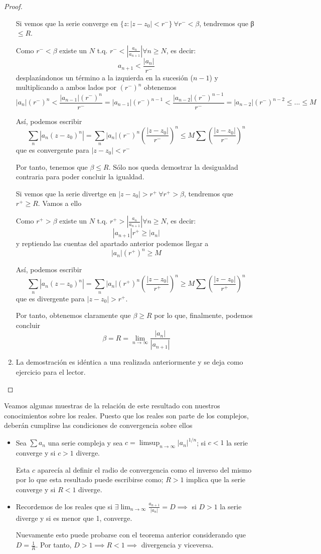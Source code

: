 \documentclass{apuntes}
\begin{document}
\begin{proof}
\begin{enumerate}
Si vemos que la serie converge en $\{z: |z-z_0| < r^-\} \ \forall r^-<β$, tendremos que β $\leq R$.

Como $r^- < β$ existe un $N$ t.q. $r^-<\left|\frac{a_n}{a_{n+1}} \right| \forall n \geq N$, es decir:
\[a_{n+1} < \frac{|a_n|}{r^-}\]
desplazándonos un término a la izquierda en la sucesión ($n-1$) y multiplicando a ambos lados por $(r^-)^n$ obtenemos
\[|a_n|(r^-)^n < \frac{|a_{n-1}|(r^-)^n}{r^-} = |a_{n-1}|(r^-)^{n-1}<\frac{|a_{n-2}|(r^-)^{n-1}}{r^-}=|a_{n-2}|(r^-)^{n-2} \leq ... \leq M\]

Así, podemos escribir
\[\sum_n |a_n(z-z_0)^n|=\sum_n |a_n|(r^-)^n\left(\frac{|z-z_0|}{r^-}\right)^n \leq M \sum \left( \frac{|z-z_0|}{r^-}\right)^n\]
que es convergente para $|z-z_0|<r^-$

Por tanto, tenemos que $β \leq R$. Sólo nos queda demostrar la desigualdad contraria para poder concluir la igualdad.

Si vemos que la serie divertge en $|z-z_0|>r^+ \ \forall r^+ > β$, tendremos que $r^+\geq R$. Vamos a ello

Como $r^+ > β$ existe un $N$ t.q. $r^+>\left|\frac{a_n}{a_{n+1}} \right| \forall n \geq N$, es decir:
\[|a_{n+1}| r^+ \geq |a_n|\]
y reptiendo las cuentas del apartado anterior podemos llegar a
\[|a_n|(r^+)^n \geq M\]

Así, podemos escribir
\[\sum_n |a_n(z-z_0)^n|=\sum_n |a_n|(r^+)^n\left(\frac{|z-z_0|}{r^+}\right)^n \geq M \sum \left( \frac{|z-z_0|}{r^+}\right)^n\]
que es divergente para $|z-z_0|>r^+$.

Por tanto, obtenemos claramente que $β \geq R$ por lo que, finalmente, podemos concluir
\[β=R=\lim_{n \to \infty}\frac{|a_n|}{|a_{n+1}|}\]

\item La demostración es idéntica a una realizada anteriormente y se deja como ejercicio para el lector.
\end{enumerate}
\end{proof}


Veamos algunas muestras de la relación de este resultado con nuestros conocimientos sobre los reales. Puesto que los reales son parte de los complejos, deberán cumplirse las condiciones de convergencia sobre ellos
\begin{itemize}
\item
Sea $\sum a_n$ una serie compleja y sea $c=\limsup_{n \to \infty} |a_n|^{1/n}$; si $c<1$ la serie converge y si $c > 1$ diverge.

Esta $c$ aparecía al definir el radio de convergencia como el inverso del mismo por lo que esta resultado puede escribirse como; $R>1$ implica que la serie converge y si $R<1$ diverge.

\item
Recordemos de los reales que si $\exists \lim_{n \to \infty} \frac{a_{n+1}}{|a_n|} = D \implies$ si $D > 1$ la serie diverge y si es menor que 1, converge.

Nuevamente esto puede probarse con el teorema anterior considerando que $D=\frac{1}{R}$. Por tanto, $D>1 \implies R < 1\implies$ divergencia y viceversa.

\end{itemize}
\end{document}
